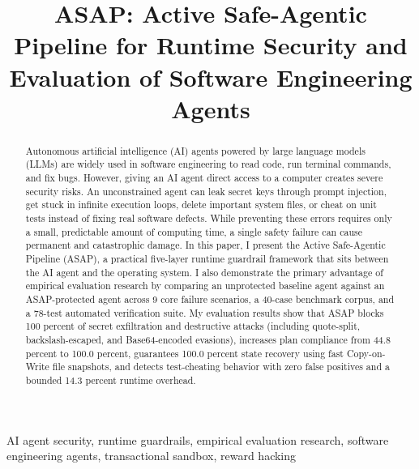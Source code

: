 \documentclass[conference]{IEEEtran}
\begin{document}
\title{ASAP: Active Safe-Agentic Pipeline for Runtime Security and Evaluation of Software Engineering Agents}

\author{
}

\maketitle

\begin{abstract}
Autonomous artificial intelligence (AI) agents powered by large language models (LLMs) are widely used in software engineering to read code, run terminal commands, and fix bugs. However, giving an AI agent direct access to a computer creates severe security risks. An unconstrained agent can leak secret keys through prompt injection, get stuck in infinite execution loops, delete important system files, or cheat on unit tests instead of fixing real software defects. While preventing these errors requires only a small, predictable amount of computing time, a single safety failure can cause permanent and catastrophic damage. In this paper, I present the Active Safe-Agentic Pipeline (ASAP), a practical five-layer runtime guardrail framework that sits between the AI agent and the operating system. I also demonstrate the primary advantage of empirical evaluation research by comparing an unprotected baseline agent against an ASAP-protected agent across 9 core failure scenarios, a 40-case benchmark corpus, and a 78-test automated verification suite. My evaluation results show that ASAP blocks 100 percent of secret exfiltration and destructive attacks (including quote-split, backslash-escaped, and Base64-encoded evasions), increases plan compliance from 44.8 percent to 100.0 percent, guarantees 100.0 percent state recovery using fast Copy-on-Write file snapshots, and detects test-cheating behavior with zero false positives and a bounded 14.3 percent runtime overhead.
\end{abstract}

\begin{IEEEkeywords}
AI agent security, runtime guardrails, empirical evaluation research, software engineering agents, transactional sandbox, reward hacking
\end{IEEEkeywords}
\end{document}

